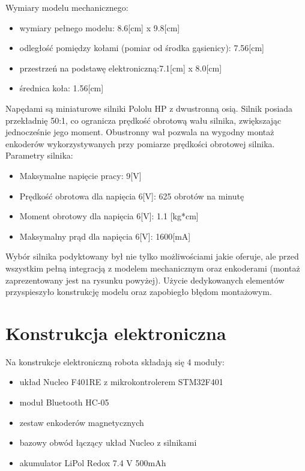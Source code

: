 \documentclass[eng,printmode]{mgr}
\begin{document}
Wymiary modelu mechanicznego:
\begin{itemize}
  \item wymiary pełnego modelu: 8.6[cm] x 9.8[cm]
  \item odległość pomiędzy kołami (pomiar od środka gąsienicy): 7.56[cm]
  \item przestrzeń na podstawę elektroniczną:7.1[cm] x 8.0[cm]
  \item średnica koła: 1.56[cm]
\end{itemize}

Napędami są miniaturowe silniki Pololu HP z dwustronną osią. Silnik posiada przekładnię 50:1, co ogranicza prędkość obrotową wału silnika, zwiększając jednocześnie jego moment. Obustronny wał pozwala na wygodny montaż enkoderów wykorzystywanych przy pomiarze prędkości obrotowej silnika. Parametry silnika:

\begin{itemize}
  \item Maksymalne napięcie pracy: 9[V]
  \item Prędkość obrotowa dla napięcia 6[V]: 625 obrotów na minutę
  \item Moment obrotowy dla napięcia 6[V]: 1.1 [kg*cm]
  \item Maksymalny prąd dla napięcia 6[V]: 1600[mA]
\end{itemize}

Wybór silnika podyktowany był nie tylko możliwościami jakie oferuje, ale przed wszystkim pełną integracją z modelem mechanicznym oraz enkoderami (montaż zaprezentowany jest na rysunku powyżej). Użycie dedykowanych elementów przyspieszyło konstrukcję modelu oraz zapobiegło błędom montażowym.

 \section{Konstrukcja elektroniczna}
Na konstrukcje elektroniczną robota składają się 4 moduły:
\begin{itemize}
  \item układ Nucleo F401RE z mikrokontrolerem STM32F401
  \item moduł Bluetooth HC-05
  \item zestaw enkoderów magnetycznych 
  \item bazowy obwód łączący układ Nucleo z silnikami 
  \item akumulator LiPol Redox 7.4 V 500mAh
\end{itemize}
\end{document}
